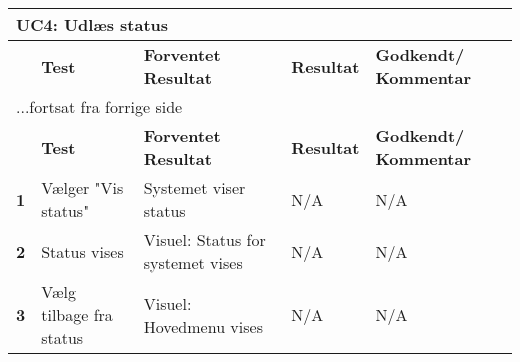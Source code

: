 
\begin{center}
\begin{longtable}{|p{}|p{}|p{}|p{}|p{}|} %
\hline
\multicolumn{5}{|l|}{\textbf{UC4: Udlæs status}} \\ \hline
\multicolumn{1}{|c|}{} &
\textbf{Test} &
\textbf{Forventet \newline Resultat} &
\textbf{Resultat} &
\textbf{Godkendt/ \newline Kommentar} \\ \hline 
\endfirsthead

\multicolumn{5}{l}{...fortsat fra forrige side} \\ \hline 
\multicolumn{1}{|c|}{} &
\textbf{Test} &
\textbf{Forventet \newline Resultat} &
\textbf{Resultat} &
\textbf{Godkendt/ \newline Kommentar} \\ \hline 
\endhead


\textbf{1} &
Vælger "Vis status" &
Systemet viser status &
N/A &
N/A \\\hline
\textbf{2} &
Status vises &
Visuel: Status for systemet vises &
N/A &
N/A \\\hline
\textbf{3} &
Vælg tilbage fra status &
Visuel: Hovedmenu vises &
N/A &
N/A \\\hline
	\end{longtable}
	\label{ATUC4} 
\end{center}